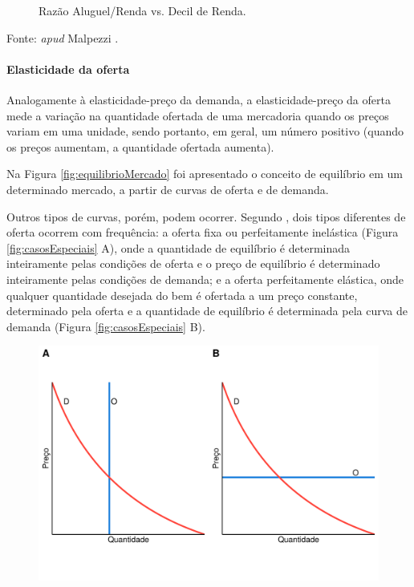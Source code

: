 \documentclass[
	12pt,				%
	oneside,			%
	a4paper,			%
	chapter=TITLE,		%
	section=TITLE,		%
	english,			%
	brazil				%
	]{abntex2}
\newcommand{\bcenter}{\begin{center}}
\newcommand{\ecenter}{\end{center}}
\begin{document}
\begin{refsection}
\begin{figure}[H]
{}

\caption{Razão Aluguel/Renda vs. Decil de Renda.}\label{fig:income-elasticity}
\end{figure}
\bcenter

\small Fonte: \textcite{green_2003} \emph{apud} Malpezzi \autocite*{malpezzi_2017}.
\ecenter

\hypertarget{elasticidade-da-oferta}{%
\paragraph{Elasticidade da oferta}\label{elasticidade-da-oferta}}

Analogamente à elasticidade-preço da demanda, a elasticidade-preço da oferta
mede a variação na quantidade ofertada de uma mercadoria quando os preços variam
em uma unidade, sendo portanto, em geral, um número positivo (quando os preços
aumentam, a quantidade ofertada aumenta).

Na Figura \ref{fig:equilibrioMercado} foi apresentado o conceito de equilíbrio
em um determinado mercado, a partir de curvas de oferta e de demanda.

Outros tipos de curvas, porém, podem ocorrer. Segundo \textcite[p.~311-312]{varian}, dois
tipos diferentes de oferta ocorrem com frequência: a oferta fixa ou
perfeitamente inelástica (Figura \ref{fig:casosEspeciais} A), onde a quantidade
de equilíbrio é determinada inteiramente pelas condições de oferta e o preço de
equilíbrio é determinado inteiramente pelas condições de demanda; e a oferta
perfeitamente elástica, onde qualquer quantidade desejada do bem é ofertada a um
preço constante, determinado pela oferta e a quantidade de equilíbrio é
determinada pela curva de demanda (Figura \ref{fig:casosEspeciais} B).
\begin{figure}[H]

{\centering \includegraphics[width=1\linewidth]{images/casosEspeciais-1} 

}
\end{figure}
\end{refsection}
\end{document}
